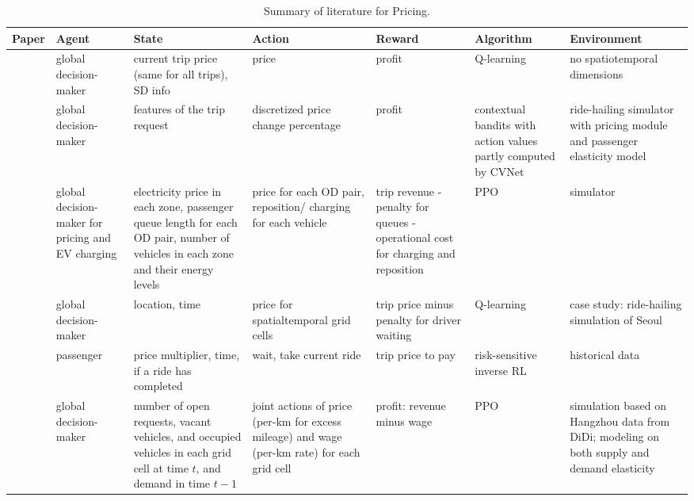\documentclass{article}
\begin{document}
\begin{table}
\hspace{-0.15\textwidth}\small
\begin{tabular}{||p{}|p{}|p{}|p{}|p{}|p{}|p{}||} 
\hline
Paper & Agent & State & Action & Reward & Algorithm & Environment \\
\hline\hline
\cite{wu2016automated} & global decision-maker & current trip price (same for all trips), SD info & price & profit & Q-learning & no spatiotemporal dimensions \\
\hline
\cite{chen2019inbede} & global decision-maker & features of the trip request & discretized price change percentage & profit & contextual bandits with action values partly computed by CVNet & ride-hailing simulator with pricing module and passenger elasticity model \\
\hline
\cite{turan2020dynamic} & global decision-maker for pricing and EV charging & electricity price in each zone, passenger queue length for each OD pair, number of vehicles in each zone and their energy levels & price for each OD pair, reposition/ charging for each vehicle & trip revenue - penalty for queues - operational cost for charging and reposition & PPO & simulator \\
\hline
\cite{song2020application} & global decision-maker & location, time & price for spatialtemporal grid cells & trip price minus penalty for driver waiting & Q-learning & case study: ride-hailing simulation of Seoul \\
\hline
\cite{mazumdar2017gradient} & passenger & price multiplier, time, if a ride has completed & wait, take current ride & trip price to pay & risk-sensitive inverse RL & historical data \\
\hline
\cite{chen2021spatial} & global decision-maker & number of open requests, vacant vehicles, and occupied vehicles in each grid cell at time $t$, and demand in time $t-1$ & joint actions of price (per-km for excess mileage) and wage (per-km rate) for each grid cell & profit: revenue minus wage & PPO & simulation based on Hangzhou data from DiDi; modeling on both supply and demand elasticity \\
\hline\hline
\end{tabular}
\caption{Summary of literature for Pricing.}
\label{tab:ref_pricing}
\end{table}
\end{document}
